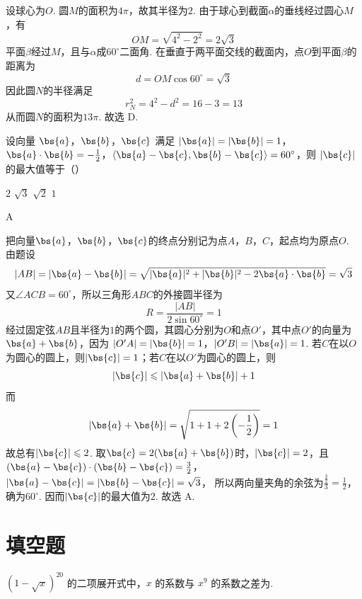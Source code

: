 \begin{solution}
设球心为\(O\). 圆\(M\)的面积为\(4\pi\)，故其半径为\(2\). 由于球心到截面\(\alpha\)的垂线经过圆心\(M\)，有
\[
OM=\sqrt{4^2-2^2}=2\sqrt3
\]
平面\(\beta\)经过\(M\)，且与\(\alpha\)成\(60^\circ\)二面角. 在垂直于两平面交线的截面内，点\(O\)到平面\(\beta\)的距离为
\[
d=OM\cos60^\circ=\sqrt3
\]
因此圆\(N\)的半径满足
\[
r_N^2=4^2-d^2=16-3=13
\]
从而圆\(N\)的面积为\(13\pi\). 故选 D.
\end{solution}


\begin{problem}
设向量 \(\bs{a}\)，\(\bs{b}\)，\(\bs{c}\) 满足 \(|\bs{a}| = |\bs{b}| = 1\)，\(\bs{a} \cdot \bs{b} = -\frac{1}{2}\)，\(\langle \bs{a} - \bs{c}, \bs{b} - \bs{c} \rangle = 60^\circ\)，则 \(|\bs{c}|\) 的最大值等于（\quad）

\choices
    {\(2\)}
    {\(\sqrt{3}\)}
    {\(\sqrt{2}\)}
    {\(1\)}
\end{problem}

\begin{answer}
A
\end{answer}

\begin{solution}
把向量\(\bs{a}\)，\(\bs{b}\)，\(\bs{c}\)的终点分别记为点\(A\)，\(B\)，\(C\)，起点均为原点\(O\). 由题设
\[
|AB|=|\bs{a}-\bs{b}|=\sqrt{|\bs{a}|^2+|\bs{b}|^2-2\bs{a}\cdot\bs{b}}=\sqrt3
\]
又\(\angle ACB=60^\circ\)，所以三角形\(ABC\)的外接圆半径为
\[
R=\frac{|AB|}{2\sin60^\circ}=1
\]
经过固定弦\(AB\)且半径为\(1\)的两个圆，其圆心分别为\(O\)和点\(O'\)，其中点\(O'\)的向量为\(\bs{a}+\bs{b}\)，因为
\(|O'A|=|\bs{b}|=1\)，\(|O'B|=|\bs{a}|=1\).
若\(C\)在以\(O\)为圆心的圆上，则\(|\bs{c}|=1\)；若\(C\)在以\(O'\)为圆心的圆上，则
\[
|\bs{c}|\leqslant|\bs{a}+\bs{b}|+1
\]
而
\[
|\bs{a}+\bs{b}|=\sqrt{1+1+2\left(-\frac12\right)}=1
\]
故总有\(|\bs{c}|\leqslant2\). 取\(\bs{c}=2(\bs{a}+\bs{b})\)时，\(|\bs{c}|=2\)，且
\((\bs{a}-\bs{c})\cdot(\bs{b}-\bs{c})=\frac32\)，\(|\bs{a}-\bs{c}|=|\bs{b}-\bs{c}|=\sqrt3\)，
所以两向量夹角的余弦为\(\frac{\frac{3}{2}}{3}=\frac12\)，确为\(60^\circ\). 因而\(|\bs{c}|\)的最大值为\(2\).
故选 A.
\end{solution}


\section{填空题}

\begin{problem}
\((1 - \sqrt{x})^{20}\) 的二项展开式中，\(x\) 的系数与 \(x^9\) 的系数之差为\fillinblank{}.
\end{problem}

